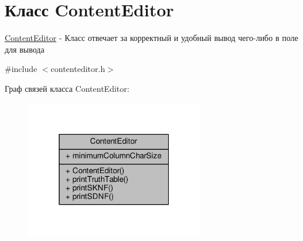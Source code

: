 \hypertarget{class_content_editor}{}\section{Класс Content\+Editor}
\label{class_content_editor}


\hyperlink{class_content_editor}{Content\+Editor} -\/ Класс отвечает за корректный и удобный вывод чего-\/либо в поле для вывода  




{\ttfamily \#include $<$contenteditor.\+h$>$}



Граф связей класса Content\+Editor\+:\nopagebreak
\begin{figure}[H]
\begin{center}
\leavevmode
\includegraphics[width=220pt]{class_content_editor__coll__graph}
\end{center}
\end{figure}
